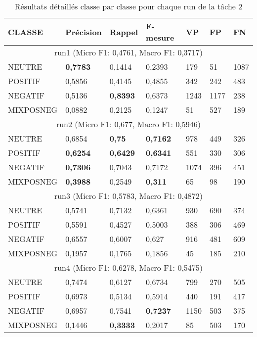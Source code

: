 
\begin{table}[h]
  \begin{center}
\begin{tabular}{l|l|l|l|l|l|l}
  CLASSE	&Précision	&Rappel	&F-mesure	&VP	&FP	&FN\\
\hline
\multicolumn{7}{c}{run1 (Micro F1: 0,4761, Macro F1: 0,3717)}\\
\hline
  NEUTRE	&\textbf{0,7783}	&0,1414	&0,2393	&179	&51	&1087\\
  POSITIF	&0,5856	&0,4145	&0,4855	&342	&242	&483\\
  NEGATIF	&0,5136	&\textbf{0,8393}	&0,6373	&1243	&1177	&238\\
  MIXPOSNEG	&0,0882	&0,2125	&0,1247	&51	&527	&189\\
\hline
\hline
\multicolumn{7}{c}{run2 (Micro F1: 0,677, Macro F1: 0,5946)}\\
\hline
  NEUTRE	&0,6854	&\textbf{0,75}	&\textbf{0,7162}	&978	&449	&326\\
  POSITIF	&\textbf{0,6254}	&\textbf{0,6429}	&\textbf{0,6341}	&551	&330	&306\\
  NEGATIF	&\textbf{0,7306}	&0,7043	&0,7172	&1074	&396	&451\\
  MIXPOSNEG	&\textbf{0,3988}	&0,2549	&\textbf{0,311}	&65	&98	&190\\
\hline
\hline
\multicolumn{7}{c}{run3 (Micro F1: 0,5783, Macro F1: 0,4872)}\\
\hline
  NEUTRE	&0,5741	&0,7132	&0,6361	&930	&690	&374\\
  POSITIF	&0,5591	&0,4527	&0,5003	&388	&306	&469\\
  NEGATIF	&0,6557	&0,6007	&0,627	&916	&481	&609\\
  MIXPOSNEG	&0,1957	&0,1765	&0,1856	&45	&185	&210\\
\hline
\hline
\multicolumn{7}{c}{run4 (Micro F1: 0,6278, Macro F1: 0,5475)}\\
\hline
  NEUTRE	&0,7474	&0,6127	&0,6734	&799	&270	&505\\
  POSITIF	&0,6973	&0,5134	&0,5914	&440	&191	&417\\
  NEGATIF	&0,6957	&0,7541	&\textbf{0,7237}	&1150	&503	&375\\
  MIXPOSNEG	&0,1446	&\textbf{0,3333}	&0,2017	&85	&503	&170\\
\hline
\end{tabular}
\caption{Résultats détaillés classe par classe pour chaque run de la tâche 2\label{tab:detail1}}
\end{center}
\end{table}

